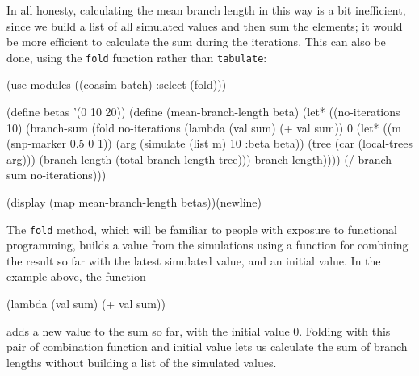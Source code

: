 \documentclass{manual}
\begin{document}
In all honesty, calculating the mean branch length in this way is a
bit inefficient, since we build a list of all simulated values and
then sum the elements; it would be more efficient to calculate the sum
during the iterations.  This can also be done, using the \texttt{fold}
function rather than \texttt{tabulate}:

\begin{code}
(use-modules ((coasim batch) :select (fold)))

(define betas '(0 10 20))
(define (mean-branch-length beta)
  (let* ((no-iterations 10)
         (branch-sum
          (fold no-iterations (lambda (val sum) (+ val sum)) 0
                (let* ((m (snp-marker 0.5 0 1))
                       (arg (simulate (list m) 10 :beta beta))
                       (tree (car (local-trees arg)))
                       (branch-length (total-branch-length tree)))
                  branch-length))))
    (/ branch-sum no-iterations)))

(display (map mean-branch-length betas))(newline)
\end{code}

The \texttt{fold} method, which will be familiar to people with
exposure to functional programming, builds a value from the
simulations using a function for combining the result so far with the
latest simulated value, and an initial value.  In the example above,
the function
\begin{code}
     (lambda (val sum) (+ val sum))
\end{code}
adds a new value to the sum so far, with the initial value 0.  Folding
with this pair of combination function and initial value lets us
calculate the sum of branch lengths without building a list of the
simulated values.
\end{document}
